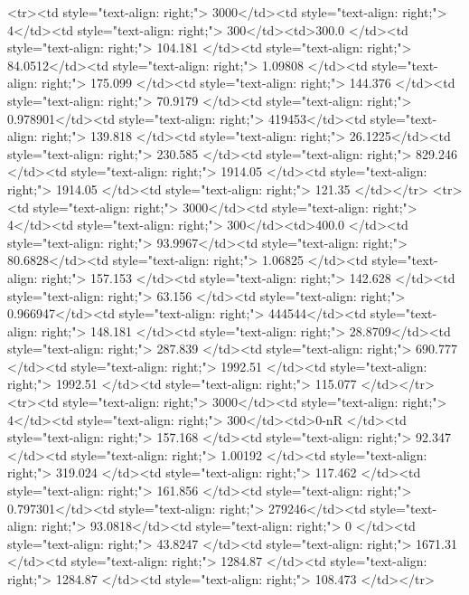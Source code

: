 <tr><td style="text-align: right;">      3000</td><td style="text-align: right;">         4</td><td style="text-align: right;">           300</td><td>300.0        </td><td style="text-align: right;">               104.181 </td><td style="text-align: right;">            84.0512</td><td style="text-align: right;">         1.09808 </td><td style="text-align: right;">        175.099 </td><td style="text-align: right;">           144.376 </td><td style="text-align: right;">              70.9179  </td><td style="text-align: right;">             0.978901</td><td style="text-align: right;">              419453</td><td style="text-align: right;">                      139.818 </td><td style="text-align: right;">            26.1225</td><td style="text-align: right;">               230.585  </td><td style="text-align: right;">       829.246 </td><td style="text-align: right;">   1914.05 </td><td style="text-align: right;">      1914.05 </td><td style="text-align: right;">                121.35  </td></tr>
<tr><td style="text-align: right;">      3000</td><td style="text-align: right;">         4</td><td style="text-align: right;">           300</td><td>400.0        </td><td style="text-align: right;">                93.9967</td><td style="text-align: right;">            80.6828</td><td style="text-align: right;">         1.06825 </td><td style="text-align: right;">        157.153 </td><td style="text-align: right;">           142.628 </td><td style="text-align: right;">              63.156   </td><td style="text-align: right;">             0.966947</td><td style="text-align: right;">              444544</td><td style="text-align: right;">                      148.181 </td><td style="text-align: right;">            28.8709</td><td style="text-align: right;">               287.839  </td><td style="text-align: right;">       690.777 </td><td style="text-align: right;">   1992.51 </td><td style="text-align: right;">      1992.51 </td><td style="text-align: right;">                115.077 </td></tr>
<tr><td style="text-align: right;">      3000</td><td style="text-align: right;">         4</td><td style="text-align: right;">           300</td><td>0-nR         </td><td style="text-align: right;">               157.168 </td><td style="text-align: right;">            92.347 </td><td style="text-align: right;">         1.00192 </td><td style="text-align: right;">        319.024 </td><td style="text-align: right;">           117.462 </td><td style="text-align: right;">             161.856   </td><td style="text-align: right;">             0.797301</td><td style="text-align: right;">              279246</td><td style="text-align: right;">                       93.0818</td><td style="text-align: right;">             0     </td><td style="text-align: right;">                43.8247 </td><td style="text-align: right;">      1671.31  </td><td style="text-align: right;">   1284.87 </td><td style="text-align: right;">      1284.87 </td><td style="text-align: right;">                108.473 </td></tr>
